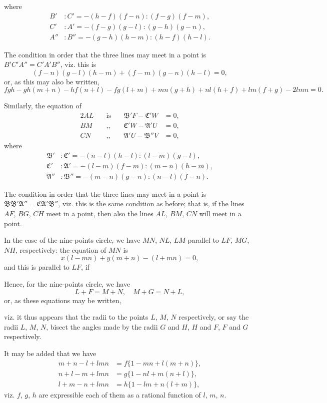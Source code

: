 \documentclass[11pt,a4paper]{book}
\begin{document}
{{{\noindent
where
\begin{align*}
B' &: C' = -(h-f)(f-n) : (f-g)(f-m),\\
C' &: A' = -(f-g)(g-l) : (g-h)(g-n),\\
A'' &: B'' = -(g-h)(h-m) : (h-f)(h-l).
\end{align*}

The condition in order that the three lines may meet in a point is
$B'C'A'' = C'A'B''$, viz. this is
\[
(f-n)(g-l)(h-m) + (f-m)(g-n)(h-l) = 0,
\]
or, as this may also be written,
\[
fgh - gh(m+n) - hf(n+l) - fg(l+m) + mn(g+h) + nl(h+f) + lm(f+g) - 2lmn = 0.
\]

Similarly, the equation of
\begin{alignat*}{2}
AL &\quad \text{is} \quad & \mathfrak{B}'F - \mathfrak{C}'W &= 0,\\
BM &\quad \text{,,} \quad & \mathfrak{C}'W - \mathfrak{A}'U &= 0,\\
CN &\quad \text{,,} \quad & \mathfrak{A}'U - \mathfrak{B}''V &= 0,
\end{alignat*}
where
\begin{align*}
\mathfrak{B}' &: \mathfrak{C}' = -(n-l)(h-l) : (l-m)(g-l),\\
\mathfrak{C}' &: \mathfrak{A}' = -(l-m)(f-m) : (m-n)(h-m),\\
\mathfrak{A}'' &: \mathfrak{B}'' = -(m-n)(g-n) : (n-l)(f-n).
\end{align*}

The condition in order that the three lines may meet in a point is
$\mathfrak{B}\mathfrak{B}'\mathfrak{A}'' = \mathfrak{C}\mathfrak{A}'\mathfrak{B}''$, viz. this is the same condition as before; that is, if the lines $AF$, $BG$, $CH$ meet in a point, then also the lines $AL$, $BM$, $CN$ will meet in a point.

In the case of the nine-points circle, we have $MN$, $NL$, $LM$ parallel to $LF$, $MG$, $NH$, respectively: the equation of $MN$ is
\[
x(l-mn) + y(m+n) - (l+mn) = 0,
\]
and this is parallel to $LF$, if \dotfill

Hence, for the nine-points circle, we have
\[
L+F = M+N, \quad M+G = N+L,
\]
or, as these equations may be written, \dotfill

viz. it thus appears that the radii to the points $L$, $M$, $N$ respectively, or say the radii $L$, $M$, $N$, bisect the angles made by the radii $G$ and $H$, $H$ and $F$, $F$ and $G$ respectively.

It may be added that we have
\begin{align*}
m+n-l+lmn &= f\{1-mn+l(m+n)\},\\
n+l-m+lmn &= g\{1-nl+m(n+l)\},\\
l+m-n+lmn &= h\{1-lm+n(l+m)\},
\end{align*}
viz. $f$, $g$, $h$ are expressible each of them as a rational function of $l$, $m$, $n$.

}}}
\end{document}
